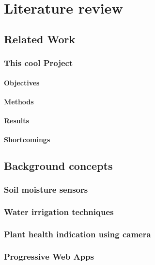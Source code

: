 \chapter{Literature review}

\section{Related Work}
\subsection{This cool Project}
\subsubsection{Objectives}
\lipsum[1-2]
\subsubsection{Methods}
\lipsum[1-2]
\subsubsection{Results}
\lipsum[1-2]
\subsubsection{Shortcomings}
\lipsum[1]


\section{Background concepts}
\subsection{Soil moisture sensors}
\lipsum[1-2]
\subsection{Water irrigation techniques}
\lipsum[1-2]
\subsection{Plant health indication using camera}
\lipsum[1-2]
\subsection{Progressive Web Apps}
\lipsum[1]